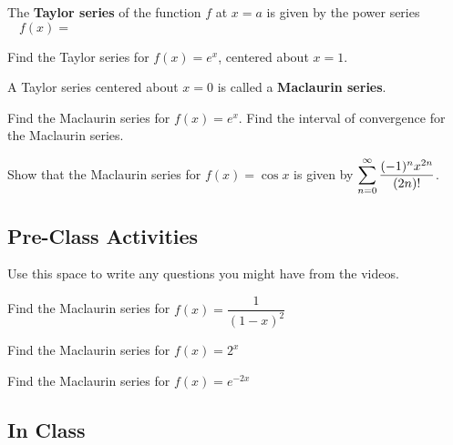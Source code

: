 \documentclass[notes]{subfiles}
\begin{document}
		\begin{defn}
			The \textbf{Taylor series} of the function $f$ at $x = a$ is given by the power series\\[15pt]
			\[f(x) = \hspace{5in}\]
		\end{defn}
		
		\begin{ex}
			Find the Taylor series for $f(x) = e^x$, centered about $x = 1$.
		\end{ex}
			\newpage
			
		\begin{defn}
			A Taylor series centered about $x = 0$ is called a \textbf{Maclaurin series}.
		\end{defn}
		
		\begin{ex}
			Find the Maclaurin series for $f(x) = e^x$.  Find the interval of convergence for the Maclaurin series.
		\end{ex}
			
		\begin{ex}
			Show that the Maclaurin series for $f(x)  = \cos x$ is given by $\displaystyle \sum_{n=0}^\infty \dfrac{(-1)^nx^{2n}}{(2n)!}$.
		\end{ex}
			\newpage
			
	\subsection*{Pre-Class Activities}
		\begin{ex}
			Use this space to write any questions you might have from the videos.
		\end{ex}
			
		\begin{ex}
			Find the Maclaurin series for $f(x) = \dfrac{1}{(1-x)^2}$
		\end{ex}
			
		\begin{ex}
			Find the Maclaurin series for $f(x) = 2^x$
		\end{ex}
			
		\begin{ex}
			Find the Maclaurin series for $f(x) = e^{-2x}$
		\end{ex}
			\newpage
			
	\subsection*{In Class}
\end{document}
